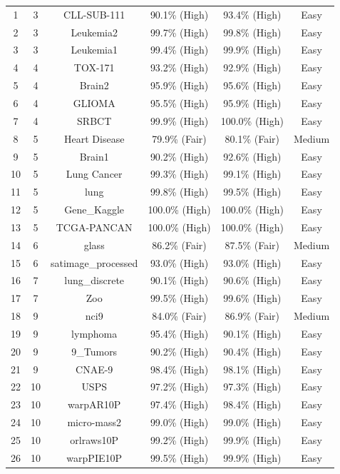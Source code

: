 \documentclass[preprint,12pt,authoryear]{elsarticle}
\begin{document}
{{\begin{longtable}{|c|c|c|c|c|c|}
\hline \hline
\endlastfoot

1 & 3 & CLL-SUB-111 & 90.1\% (High) & 93.4\% (High) & Easy \\
2 & 3 & Leukemia2 & 99.7\% (High) & 99.8\% (High) & Easy \\
3 & 3 & Leukemia1 & 99.4\% (High) & 99.9\% (High) & Easy \\
4 & 4 & TOX-171 & 93.2\% (High) & 92.9\% (High) & Easy \\
5 & 4 & Brain2 & 95.9\% (High) & 95.6\% (High) & Easy \\
6 & 4 & GLIOMA & 95.5\% (High) & 95.9\% (High) & Easy \\
7 & 4 & SRBCT & 99.9\% (High) & 100.0\% (High) & Easy \\
8 & 5 & Heart Disease & 79.9\% (Fair) & 80.1\% (Fair) & Medium \\
9 & 5 & Brain1 & 90.2\% (High) & 92.6\% (High) & Easy \\
10 & 5 & Lung Cancer & 99.3\% (High) & 99.1\% (High) & Easy \\
11 & 5 & lung & 99.8\% (High) & 99.5\% (High) & Easy \\
12 & 5 & Gene\_Kaggle & 100.0\% (High) & 100.0\% (High) & Easy \\
13 & 5 & TCGA-PANCAN & 100.0\% (High) & 100.0\% (High) & Easy \\
14 & 6 & glass & 86.2\% (Fair) & 87.5\% (Fair) & Medium \\
15 & 6 & satimage\_processed & 93.0\% (High) & 93.0\% (High) & Easy \\
16 & 7 & lung\_discrete & 90.1\% (High) & 90.6\% (High) & Easy \\
17 & 7 & Zoo & 99.5\% (High) & 99.6\% (High) & Easy \\
18 & 9 & nci9 & 84.0\% (Fair) & 86.9\% (Fair) & Medium \\
19 & 9 & lymphoma & 95.4\% (High) & 90.1\% (High) & Easy \\
20 & 9 & 9\_Tumors & 90.2\% (High) & 90.4\% (High) & Easy \\
21 & 9 & CNAE-9 & 98.4\% (High) & 98.1\% (High) & Easy \\
22 & 10 & USPS & 97.2\% (High) & 97.3\% (High) & Easy \\
23 & 10 & warpAR10P & 97.4\% (High) & 98.4\% (High) & Easy \\
24 & 10 & micro-mass2 & 99.0\% (High) & 99.0\% (High) & Easy \\
25 & 10 & orlraws10P & 99.2\% (High) & 99.9\% (High) & Easy \\
26 & 10 & warpPIE10P & 99.5\% (High) & 99.9\% (High) & Easy \\

\end{longtable}}}
\end{document}
